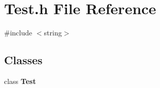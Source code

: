 \section{Test.\+h File Reference}
\label{Test_8h}
{\ttfamily \#include $<$string$>$}\newline
\subsection*{Classes}
\begin{DoxyCompactItemize}
\item 
class \textbf{ Test}
\end{DoxyCompactItemize}
